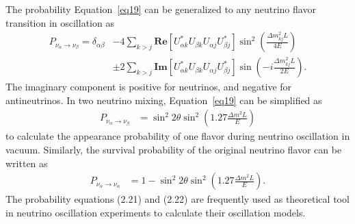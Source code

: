     The probability Equation~\ref{eq19} can be generalized to any neutrino flavor transition in oscillation as
\begin{equation}\label{eq20}
\begin{aligned}
	P_{\nu_\alpha\rightarrow\nu_\beta} = \delta_{\alpha\beta} & -  4 \sum\limits_{k>j}\textbf{Re} \left[ U^*_{\alpha k} U_{\beta k} U_{\alpha j} U^*_{\beta j}\right]\sin^2\left(\frac{\Delta m^2_{kj}L}{4E}\right) \\
	 & \pm 2 \sum\limits_{k>j} \textbf{Im} \left[
	 U^*_{\alpha k} U_{\beta k} U_{\alpha j} U^*_{\beta j}\right]\sin\left(-i\frac{\Delta m^2_{kj}L}{2E}\right).
\end{aligned}
\end{equation}
    The imaginary component is positive for neutrinos, and negative for antineutrinos. 
    In two neutrino mixing, Equation~\ref{eq19} can be simplified as
    \begin{equation}\label{eq21}
    \begin{aligned}
    P_{\nu_\alpha\rightarrow\nu_\beta} & = \sin^2{2\theta}\sin^2\left( 1.27\frac{\Delta m^2L}{E} \right)
    \end{aligned}
    \end{equation}
    to calculate the appearance probability of one flavor during neutrino oscillation in vacuum.
    Similarly, the survival probability of the original neutrino flavor can be written as 
    \begin{equation}\label{eq22}
    \begin{aligned}
    P_{\nu_\alpha\rightarrow\nu_\alpha} & = 1- \sin^2{2\theta}\sin^2\left( 1.27\frac{\Delta m^2L}{E} \right).
    \end{aligned}
    \end{equation}
    The probability equations (2.21) and (2.22) are frequently used as theoretical tool in neutrino oscillation experiments to calculate their oscillation models.

    
